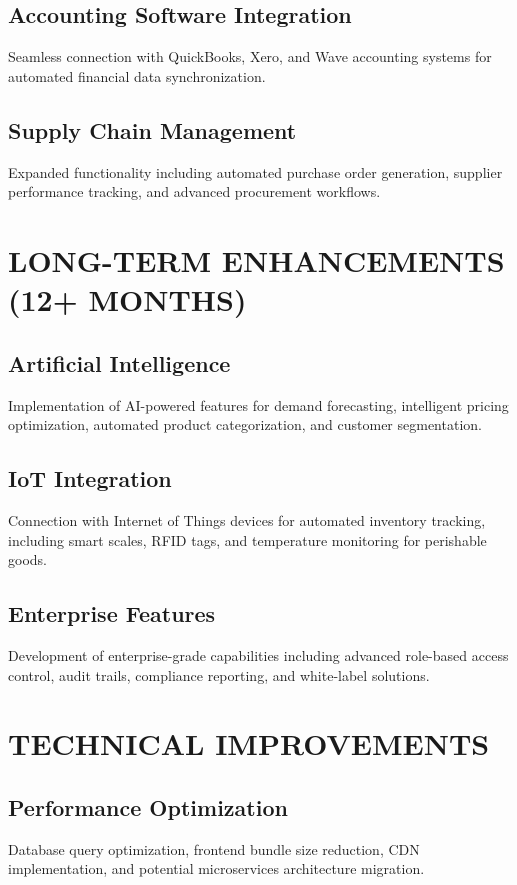 \subsection{Accounting Software Integration}
Seamless connection with QuickBooks, Xero, and Wave accounting systems for automated financial data synchronization.

\subsection{Supply Chain Management}
Expanded functionality including automated purchase order generation, supplier performance tracking, and advanced procurement workflows.

\section{LONG-TERM ENHANCEMENTS (12+ MONTHS)}

\subsection{Artificial Intelligence}
Implementation of AI-powered features for demand forecasting, intelligent pricing optimization, automated product categorization, and customer segmentation.

\subsection{IoT Integration}
Connection with Internet of Things devices for automated inventory tracking, including smart scales, RFID tags, and temperature monitoring for perishable goods.

\subsection{Enterprise Features}
Development of enterprise-grade capabilities including advanced role-based access control, audit trails, compliance reporting, and white-label solutions.

\section{TECHNICAL IMPROVEMENTS}

\subsection{Performance Optimization}
Database query optimization, frontend bundle size reduction, CDN implementation, and potential microservices architecture migration.


